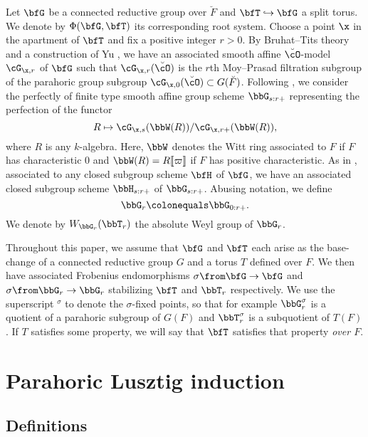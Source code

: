 Let $\bfG$ be a connected reductive group over $\breve F$ and $\bfT \hookrightarrow \bfG$ a split torus. We denote by $\Phi(\bfG,\bfT)$ its corresponding root system. Choose a point $\x$ in the apartment of $\bfT$ and fix a positive integer $r > 0$. By Bruhat--Tits theory and a construction of Yu \cite{Yu15}, we have an associated smooth affine $\breve \cO$-model $\cG_{\x,r}$ of $\bfG$ such that $\cG_{\x,r}(\breve \cO)$ is the $r$th Moy--Prasad filtration subgroup \cite{MP94,MP96} of the parahoric group subgroup $\cG_{\x,0}(\breve \cO) \subset G(\breve F)$. Following \cite[Section 2.5]{CI21-RT}, we consider the perfectly of finite type smooth affine group scheme $\bbG_{s:r+}$ representing the perfection of the functor
\begin{equation}
  R \mapsto \cG_{\x,s}(\bbW(R))/\cG_{\x,r+}(\bbW(R)),
\end{equation}
where $R$ is any $k$-algebra. Here, $\bbW$ denotes the Witt ring associated to $F$ if $F$ has characteristic $0$ and $\bbW(R) = R[\![\varpi]\!]$ if $F$ has positive characteristic. As in \cite[Section 2.6]{CI21-RT}, associated to any closed subgroup scheme $\bfH$ of $\bfG$, we have an associated closed subgroup scheme $\bbH_{s:r+}$ of $\bbG_{s:r+}$. Abusing notation, we define
\begin{equation*}
  \bbG_r \colonequals \bbG_{0:r+}.
\end{equation*}
We denote by $W_{\bbG_r}(\bbT_r)$ the absolute Weyl group of $\bbG_r$. 

Throughout this paper, we assume that $\bfG$ and $\bfT$ each arise as the base-change of a connected reductive group $G$ and a torus $T$ defined over $F$. We then have associated Frobenius endomorphisms $\sigma \from \bfG \to \bfG$ and $\sigma \from \bbG_r \to \bbG_r$ stabilizing $\bfT$ and $\bbT_r$ respectively. We use the superscript ${}^\sigma$ to denote the $\sigma$-fixed points, so that for example $\bbG_r^\sigma$ is a quotient of a parahoric subgroup of $G(F)$ and $\bbT_r^\sigma$ is a subquotient of $T(F)$. If $T$ satisfies some property, we will say that $\bfT$ satisfies that property \textit{over $F$}.

\section{Parahoric Lusztig induction}\label{sec:parahoric lusztig}

\subsection{Definitions}


